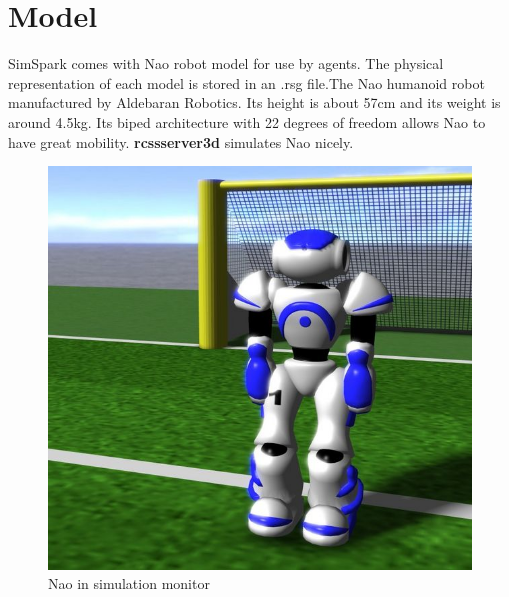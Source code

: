 \section{Model}
SimSpark comes with Nao robot model for use by agents. The physical representation of each model is stored in an .rsg file.The Nao humanoid robot manufactured by Aldebaran Robotics. Its height is about 57cm and its weight is around 4.5kg. Its biped architecture with 22 degrees of freedom allows Nao to have great mobility. { \bf rcssserver3d} simulates Nao nicely.
\begin{figure}[ht]
\centering
  \includegraphics[scale=0.3]{Chapter2/figures/629px-Models-nao.jpg}
  \caption{Nao in simulation monitor} 
  \label{fig:Naoinsimulationscreen}
\end{figure}